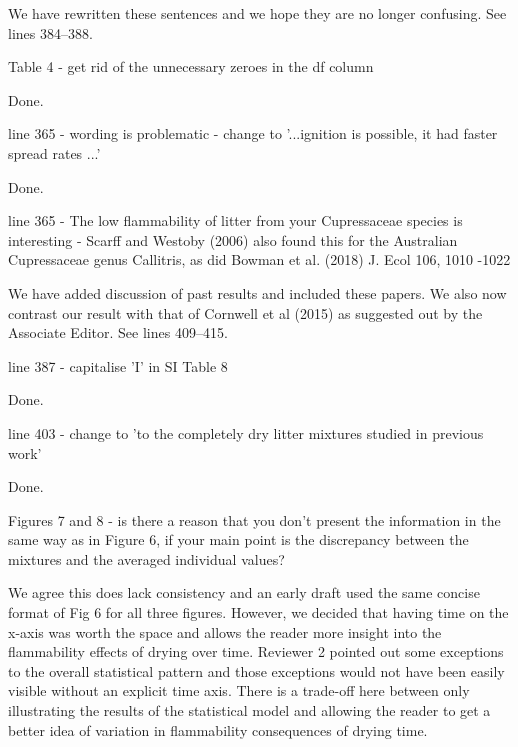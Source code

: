 \documentclass[letterpaper, 12pt]{letter}
\begin{document}
\begin{letter}{}
We have rewritten these sentences and we hope they are no longer confusing. See
lines 384--388.

\begin{quoting}
Table 4 - get rid of the unnecessary zeroes in the df column
\end{quoting}

Done.

\begin{quoting}
  line 365 - wording is problematic - change to '...ignition is possible, it
  had faster spread rates ...'
\end{quoting}

Done. 

\begin{quoting}
  line 365 - The low flammability of litter from your Cupressaceae species is
  interesting - Scarff and Westoby (2006) also found this for the Australian
  Cupressaceae genus Callitris, as did Bowman et al. (2018) J. Ecol 106, 1010
  -1022
\end{quoting}

We have added discussion of past results and included these papers. We also now
contrast our result with that of Cornwell et al (2015) as suggested out by the
Associate Editor. See lines 409--415.

\begin{quoting}
line 387 - capitalise 'I' in SI Table  8
\end{quoting}

Done.

\begin{quoting}
line 403 - change to 'to the completely dry litter mixtures studied in previous work'
\end{quoting}

Done.

\begin{quoting}
  Figures 7 and 8 - is there a reason that you don't present the information in
  the same way as in Figure 6, if your main point is the discrepancy between
  the mixtures and the averaged individual values?
\end{quoting}

We agree this does lack consistency and an early draft used the same concise
format of Fig 6 for all three figures. However, we decided that having time on
the x-axis was worth the space and allows the reader more insight into the
flammability effects of drying over time. Reviewer 2 pointed out some
exceptions to the overall statistical pattern and those exceptions would not
have been easily visible without an explicit time axis. There is a trade-off
here between only illustrating the results of the statistical model and
allowing the reader to get a better idea of variation in flammability
consequences of drying time.


\end{letter}
\end{document}
